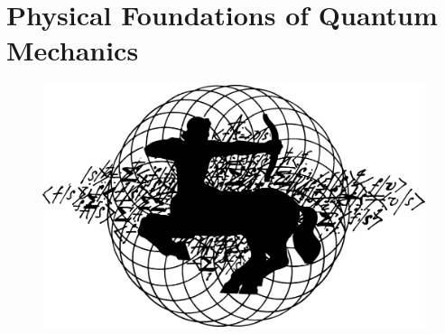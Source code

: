 \documentclass[a4paper,sfsidenotes,colorlinks=true]{tufte-book}
\numberwithin{equation}{section}
\numberwithin{figure}{section}
\begin{document}


\chapter[Physical Foundations of Quantum Mechanics]{Physical Foundations of \newline Quantum Mechanics}


\begin{figure}%
\centering
\includegraphics[width=\linewidth]{figures/ch-02.pdf}
\end{figure}
\cleardoublepage
\end{document}
